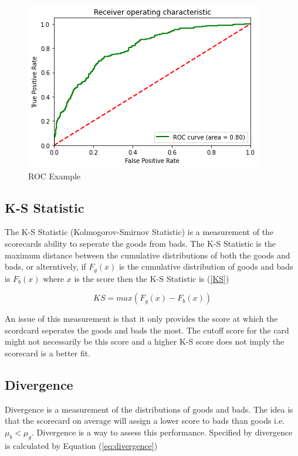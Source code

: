 \begin{figure}[!ht]
	\centering
	\includegraphics[scale=1.00]{figs/roc_example.png}
	\caption{ROC Example \label{roc_example}}
\end{figure}

\subsection*{K-S Statistic}

The K-S Statistic (Kolmogorov-Smirnov Statistic) is a measurement of the scorecards ability to seperate the goods from bads. The K-S Statistic is the maximum distance between the cumulative distributions of both the goods and bads, or alterntively, if $F_{g}(x)$ is the cumulative distribution of goods and bads is $F_{b}(x)$ where $x$ is the score then the K-S Statistic is (\ref{KS})

\begin{equation}\label{KS}
KS = max(F_{g}(x) - F_{b}(x))
\end{equation}

An issue of this measurement is that it only provides the score at which the scordcard seperates the goods and bads the most. The cutoff score for the card might not necessarily be this score and a higher K-S score does not imply the scorecard is a better fit. 

\subsection*{Divergence}

Divergence is a measurement of the distributions of goods and bads. The idea is that the scorecard on average will assign a lower score to bads than goods i.e. $\mu_{b} < \mu_{g}$. Divergence is a way to assess this performance. Specified by \parencite{bailey2004credit} divergence is calculated by Equation (\ref{eq:divergence})

